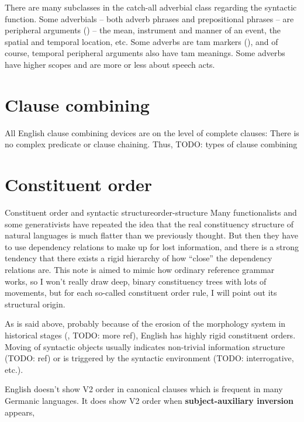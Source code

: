 \documentclass[UTF8, a4paper, oneside, scheme=plain]{ctexrep}
\newcommand*{\concept}[1]{\textbf{#1}}
\begin{document}
There are many subclasses in the catch-all adverbial class
regarding the syntactic function.
Some adverbials -- both adverb phrases and prepositional phrases -- 
are peripheral arguments () -- 
the mean, instrument and manner of an event,
the spatial and temporal location, etc. 
Some adverbs are \acs{tam} markers (),
and of course, temporal peripheral arguments also have \acs{tam} meanings.
Some adverbs have higher scopes and are more or less about speech acts.

\section{Clause combining}\label{sec:clause-combining}

All English clause combining devices are on the level of complete clauses:
There is no complex predicate or clause chaining.
Thus, TODO: types of clause combining

\section{Constituent order}\label{sec:overview.constituent-order}

\begin{theorybox}{Constituent order and syntactic structure}{order-structure}
    Many functionalists and some generativists have repeated the idea that 
    the real constituency structure of natural languages 
    is much flatter than we previously thought.
    But then they have to use dependency relations to make up for lost information,
    and there is a strong tendency that 
    there exists a rigid hierarchy of how ``close'' the dependency relations are.
    This note is aimed to mimic how ordinary reference grammar works,
    so I won't really draw deep, binary constituency trees with lots of movements,
    but for each so-called constituent order rule,
    I will point out its structural origin.
\end{theorybox}

As is said above, probably because of the erosion of the morphology system in historical stages
(, TODO: more ref),
English has highly rigid constituent orders. 
Moving of syntactic objects usually indicates 
non-trivial information structure (TODO: ref) 
or is triggered by the syntactic environment (TODO: interrogative, etc.).

English doesn't show V2 order in canonical clauses which is frequent in many Germanic languages.
It does show V2 order when \concept{subject-auxiliary inversion} appears,
\end{document}
